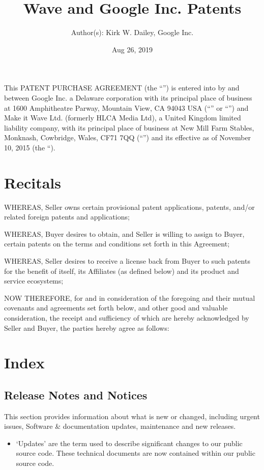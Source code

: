 \documentclass[letterpaper,10pt,openany,oneside,english]{sphinxmanual}
\title{Wave and Google Inc. Patents}
\date{Aug 26, 2019}
\author{Author(s): Kirk W. Dailey, Google Inc.}
\begin{document}
\maketitle
\sphinxtableofcontents
{}\label{\detokenize{index::doc}}


This PATENT PURCHASE AGREEMENT (the “”) is entered into by and between Google Inc. a Delaware corporation with its principal place of business at 1600 Amphitheatre Parway, Mountain View, CA 94043 USA (“” or “”) and Make it Wave Ltd. (formerly HLCA Media Ltd), a United Kingdom limited liability company, with its principal place of business at New Mill Farm Stables, Monknash, Cowbridge, Wales, CF71 7QQ (“”) and its effective as of November 10, 2015 (the “).


\chapter{Recitals}
\label{\detokenize{index:recitals}}
WHEREAS, Seller owns certain provisional patent applications, patents, and/or related foreign patents and applications;

WHEREAS, Buyer desires to obtain, and Seller is willing to assign to Buyer, certain patents on the terms and conditions set forth in this Agreement;

WHEREAS, Seller desires to receive a license back from Buyer to such patents for the benefit of itself, its Affiliates (as defined below) and its product and service ecosystems;

NOW THEREFORE, for and in consideration of the foregoing and their mutual covenants and agreements set forth below, and other good and valuable consideration, the receipt and sufficiency of which are hereby acknowledged by Seller and Buyer, the parties hereby agree as follows:


\chapter{Index}
\label{\detokenize{index:index}}

\section{Release Notes and Notices}
\label{\detokenize{releasenotes:release-notes-and-notices}}\label{\detokenize{releasenotes::doc}}
This section provides information about what is new or changed, including urgent issues, Software \& documentation updates, maintenance and new releases.
\begin{itemize}
\item {} 
‘Updates’ are the term used to describe significant changes to our public source code. These technical documents are now contained within our public source code.

\end{itemize}
\end{document}
